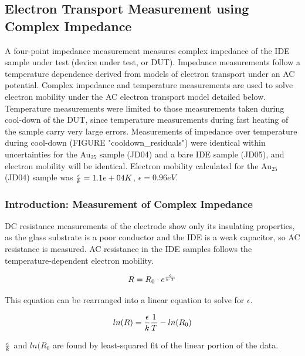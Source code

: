 
	\subsection{Electron Transport Measurement using Complex Impedance}
	A four-point impedance measurement measures complex impedance of the IDE sample under test (device under test, or DUT).  
	Impedance measurements follow a temperature dependence derived from models of electron transport under an AC potential.  
	Complex impedance and temperature measurements are used to solve electron mobility under the AC electron transport model detailed below.  
	Temperature measurements were limited to those measurements taken during cool-down of the DUT, since temperature measurements during fast heating of the sample carry very large errors.  
	Measurements of impedance over temperature during cool-down (FIGURE "cooldown\_residuals") were identical within uncertainties for the Au$_25$ sample (JD04) and a bare IDE sample (JD05), and electron mobility will be identical.  
	Electron mobility calculated for the Au$_25$ (JD04) sample was ${\epsilon\over{k}} = 1.1e+04 K$, $\epsilon = 0.96 eV$.
		
	\subsubsection{Introduction: Measurement of Complex Impedance} 
	DC resistance measurements of the electrode show only its insulating properties, as the glass substrate is a poor conductor and the IDE is a weak capacitor, so AC resistance is measured.
	AC resistance in the IDE samples follows the temperature-dependent electron mobility.
	
	\begin{equation}
		R = R_0 \cdot e^{\epsilon\over{k \cdot T}}
		\label{eq:emobility}
	\end{equation}
	
	This equation can be rearranged into a linear equation to solve for $\epsilon$.
	
	\begin{equation}
		ln(R) = {\epsilon\over{k}} {1\over{T}} - ln(R_0)
		\label{eq:solve_emobility}
	\end{equation}
	
	${\epsilon\over{k}}$ and $ln(R_0$ are found by least-squared fit of the linear portion of the data.
	

